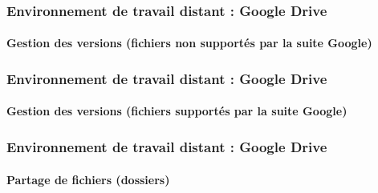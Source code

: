 \documentclass[xcolor=table]{beamer}
\begin{document}
\begin{frame}
\frametitle{Environnement de travail distant : Google Drive}
\framesubtitle{Gestion des versions (fichiers non supportés par la suite Google)}

\begin{center}
\end{center}

\end{frame}

\begin{frame}
\frametitle{Environnement de travail distant : Google Drive}
\framesubtitle{Gestion des versions (fichiers supportés par la suite Google)}

\begin{center}
	\vline
\end{center}

\end{frame}

\begin{frame}
\frametitle{Environnement de travail distant : Google Drive}
\framesubtitle{Partage de fichiers (dossiers)}

\begin{center}
\end{center}

\end{frame}

\end{document}

